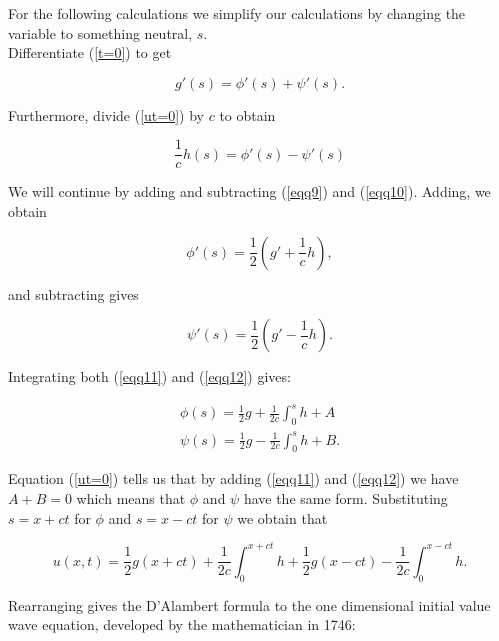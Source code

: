 \documentclass[12pt]{article}
\numberwithin{equation}{section}
\begin{document}
For the following calculations we simplify our calculations by changing the variable to something neutral, $s$. 
\\

Differentiate (\ref{t=0}) to get

\begin{equation} \label{eqq9}
    g'(s)=\phi'(s)+\psi'(s).
\end{equation}

Furthermore, divide (\ref{ut=0}) by $c$ to obtain

\begin{equation} \label{eqq10}
    \frac{1}{c}h(s)=\phi'(s)-\psi'(s)
\end{equation}

We will continue by adding and subtracting (\ref{eqq9}) and (\ref{eqq10}). Adding, we obtain

\begin{equation} \label{eqq11}
    \phi'(s)=\frac{1}{2}(g'+\frac{1}{c}h),
\end{equation}

and subtracting gives

\begin{equation} \label{eqq12}
    \psi'(s)=\frac{1}{2}(g'-\frac{1}{c}h).
\end{equation}

Integrating both (\ref{eqq11}) and (\ref{eqq12}) gives:

\begin{equation}
    \begin{aligned}
    \phi(s)=\frac{1}{2}g+\frac{1}{2c}\int^s_0h+A\\
    \psi(s)=\frac{1}{2}g-\frac{1}{2c}\int^s_0h+B.
    \end{aligned}
\end{equation}

Equation (\ref{ut=0}) tells us that by adding (\ref{eqq11}) and (\ref{eqq12}) we have $A+B=0$ which means that $\phi$ and $\psi$ have the
same form. \cite{Str} Substituting $s=x+ct$ for $\phi$ and $s=x-ct$ for $\psi$ we obtain that

\begin{equation}
    u(x,t)=\frac{1}{2}g(x+ct)+\frac{1}{2c}\int^{x+ct}_0h+\frac{1}{2}g(x-ct)-\frac{1}{2c}\int^{x-ct}_0h.
\end{equation}

Rearranging gives the D'Alambert formula to the one dimensional initial value wave equation, developed by the mathematician in 1746: \cite{Str}
\end{document}
